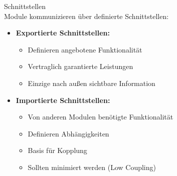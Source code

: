 \begin{definition}{Schnittstellen}\\
Module kommunizieren über definierte Schnittstellen:

\begin{itemize}
    \item \textbf{Exportierte Schnittstellen:}
    \begin{itemize}
        \item Definieren angebotene Funktionalität
        \item Vertraglich garantierte Leistungen
        \item Einzige nach außen sichtbare Information
    \end{itemize}
    
    \item \textbf{Importierte Schnittstellen:}
    \begin{itemize}
        \item Von anderen Modulen benötigte Funktionalität
        \item Definieren Abhängigkeiten
        \item Basis für Kopplung
        \item Sollten minimiert werden (Low Coupling)
    \end{itemize}
\end{itemize}
\end{definition}

